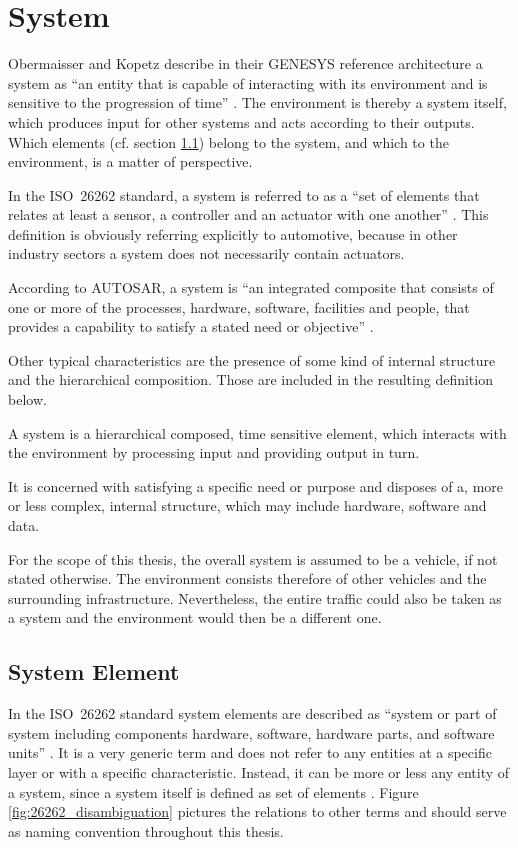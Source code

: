 \label{ch:methods}

\section{System}
\label{ch:system}
Obermaisser and Kopetz describe in their GENESYS reference architecture a system as ``an entity that is capable of interacting with its environment and is sensitive to the progression of time'' \cite[p.7]{genesys}. The environment is thereby a system itself, which produces input for other systems and acts according to their outputs. Which elements (cf. section \ref{sec:system_element}) belong to the system, and which to the environment, is a matter of perspective. 

In the \mbox{ISO 26262} standard, a system is referred to as a ``set of elements that relates at least a sensor, a controller and an actuator with one another'' \cite{iso26262:1}. This definition is obviously referring explicitly to automotive, because in other industry sectors a system does not necessarily contain actuators.

According to AUTOSAR, a system is ``an integrated composite that consists of one or more of the processes, hardware, software, facilities and people, that provides a capability to satisfy a stated need or objective'' \cite{autosar_glossary}.

Other typical characteristics are the presence of some kind of internal structure and the hierarchical composition. Those are included in the resulting definition below.

\begin{myquote}
A system is a hierarchical composed, time sensitive element, which interacts with the environment by processing input and providing output in turn.

It is concerned with satisfying a specific need or purpose and disposes of a, more or less complex, internal structure, which may include hardware, software and data.
\end{myquote}

For the scope of this thesis, the overall system is assumed to be a vehicle, if not stated otherwise. The environment consists therefore of other vehicles and the surrounding infrastructure. Nevertheless, the entire traffic could also be taken as a system and the environment would then be a different one.



\subsection{System Element}
\label{sec:system_element}
In the \mbox{ISO 26262} standard system elements are described as ``system or part of system including components hardware, software, hardware parts, and software units'' \cite{iso26262:1}. It is a very generic term and does not refer to any entities at a specific layer or with a specific characteristic. Instead, it can be more or less any entity of a system, since a system itself is defined as set of elements \cite{iso26262:1}. Figure \ref{fig:26262_disambiguation} pictures the relations to other terms and should serve as naming convention throughout this thesis.

